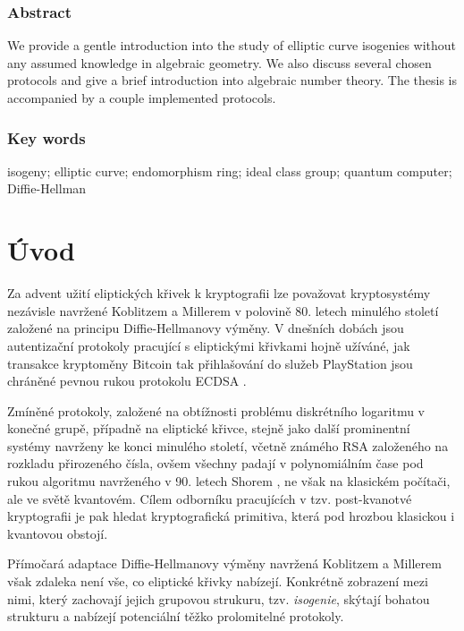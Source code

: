 \documentclass[12pt]{report}
\begin{document}
\vspace*{4cm}

\subsection*{Abstract}
We provide a gentle introduction into the study of elliptic curve isogenies without any assumed knowledge in algebraic geometry. We also discuss several chosen protocols and give a brief introduction into algebraic number theory. The thesis is accompanied by a couple implemented protocols.

\subsection*{Key words}
isogeny; elliptic curve; endomorphism ring; ideal class group; quantum computer; Diffie-Hellman





{
\hypersetup{linkcolor=black}
\tableofcontents
}
\thispagestyle{empty}

\chapter*{Úvod}

Za advent užití eliptických křivek k kryptografii lze považovat kryptosystémy nezávisle navržené Koblitzem \cite{Koblitz} a Millerem \cite{Miller} v polovině 80. letech minulého století založené na principu Diffie-Hellmanovy \cite{Diffie} výměny. V dnešních dobách jsou autentizační protokoly pracující s eliptickými křivkami hojně užíváné, jak transakce kryptoměny Bitcoin tak přihlašování do služeb PlayStation jsou chráněné pevnou rukou protokolu ECDSA \cite{ECDSA}.

Zmíněné protokoly, založené na obtížnosti problému diskrétního logaritmu v konečné grupě, případně na eliptické křivce, stejně jako další prominentní systémy navrženy ke konci minulého století, včetně  známého RSA \cite{RSA} založeného na rozkladu přirozeného čísla, ovšem všechny padají v polynomiálním čase pod rukou algoritmu navrženého v 90. letech Shorem \cite{Shor}, ne však na klasickém počítači, ale ve světě kvantovém. Cílem odborníku pracujících v tzv. post-kvanotvé kryptografii je pak hledat kryptografická primitiva, která pod hrozbou klasickou i kvantovou obstojí.

Přímočará adaptace Diffie-Hellmanovy výměny navržená Koblitzem a Millerem však zdaleka není vše, co eliptické křivky nabízejí. Konkrétně zobrazení mezi nimi, který zachovají jejich grupovou strukuru, tzv. \textit{isogenie}, skýtají bohatou strukturu a nabízejí potenciální těžko prolomitelné protokoly.
\end{document}
